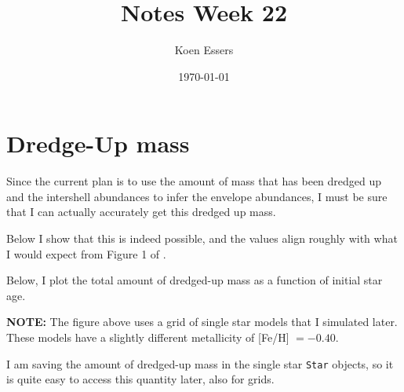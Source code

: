 \documentclass[a4paper,10pt]{article}
\title{Notes Week 22}
\author{Koen Essers}
\date{\today}
\begin{document}
\setuplayout
\section{Dredge-Up mass}
Since the current plan is to use the amount of mass that has been dredged up and the intershell abundances to infer the envelope abundances, I must be sure that I can actually accurately get this dredged up mass.

Below I show that this is indeed possible, and the values align roughly with what I would expect from Figure 1 of \citet{karakas2016}.
\begin{figure}[ht]
    \centering
\end{figure}

Below, I plot the total amount of dredged-up mass as a function of initial star age.

\begin{figure}[ht]
    \centering
\end{figure}
\begin{questionbox}{}{}
\textbf{\textcolor{keywordscolor}{NOTE:}}
The figure above uses a grid of single star models that I simulated later. These models have a slightly different metallicity of [Fe/H] \(= -0.40\).
\end{questionbox}

I am saving the amount of dredged-up mass in the single star \lstinline[style=output, breaklines=true]|Star| objects, so it is quite easy to access this quantity later, also for grids.
\end{document}
